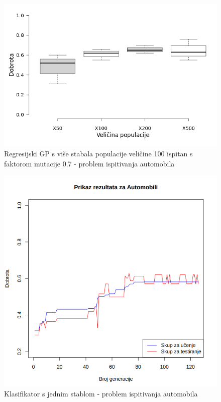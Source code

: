 \documentclass[times, utf8, zavrsni]{fer}
\begin{document}
\begin{figure}[htb]
\centering
\includegraphics[scale=0.5]{grafovi/boxplotCarM}
\caption{Regresijski GP s više stabala populacije veličine 100 ispitan s faktorom mutacije 0.7 - problem ispitivanja automobila}
\end{figure}

\begin{figure}[htb]
\centering
\includegraphics[scale=0.45]{grafovi/automobili1-3}
\caption{Klasifikator s jednim stablom - problem ispitivanja automobila}
\end{figure}
\end{document}
